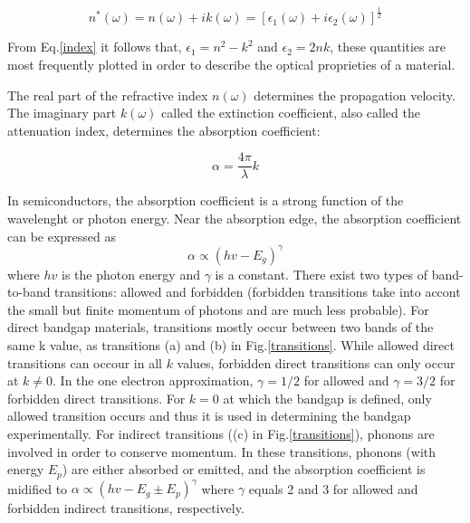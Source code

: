 \documentclass[%
reprint,
amsmath,amssymb,
aps,
]{revtex4-1}
\begin{document}
	\begin{equation}
		n^*(\omega) = n(\omega) + ik(\omega)  =  {[\epsilon_1(\omega) + i\epsilon_2(\omega)]}^\frac{1}{2}
		\label{index}
	\end{equation}
	
	From  Eq.\ref{index} it follows that, $ \epsilon_1 = n^2 - k^2$ and $ \epsilon_2 = 2nk $, these quantities are most frequently plotted in order to describe the optical proprieties of a material.
	
	
	The real part of the refractive index $n(\omega)$ determines the propagation velocity.
	The imaginary part $ k(\omega) $ called the extinction coefficient, also called the attenuation index, determines the absorption coefficient:
	
	\begin{equation}
		\alpha = \dfrac{4\pi}{\lambda} k
	\end{equation}
	
	In semiconductors, the absorption coefficient is a strong function of the wavelenght or photon energy. Near the absorption edge, the absorption coefficient can be expressed as
	\begin{equation}
		\alpha \propto (hv - E_{g})^\gamma 
		\label{ab}
	\end{equation}
	where $ hv $ is the photon energy and $ \gamma $ is a constant. There exist two types of band-to-band transitions: allowed and forbidden (forbidden transitions take into accont the small but finite momentum of photons and are much less probable). For direct bandgap materials, transitions mostly occur between two bands of the same k value, as transitions (a) and (b) in Fig.\ref{transitions}. While allowed direct transitions can occour in all $  k $ values, forbidden direct transitions can only occur at $ k \neq 0 $. In the one electron approximation, $ \gamma = 1/2 $ for allowed and $ \gamma = 3/2 $ for forbidden direct transitions. For $ k=0 $ at which the bandgap is defined, only allowed transition occurs and thus it is used in determining the bandgap experimentally. For indirect transitions ((c) in Fig.\ref{transitions}), phonons are involved in order to conserve momentum. In these transitions, phonons (with energy $ E_p $) are either absorbed or emitted, and the absorption coefficient is midified to $ \alpha \propto (hv - E_{g} \pm E_p)^\gamma $ where $ \gamma $ equals 2 and 3 for allowed and forbidden indirect transitions, respectively.
	
	
	
\end{document}
